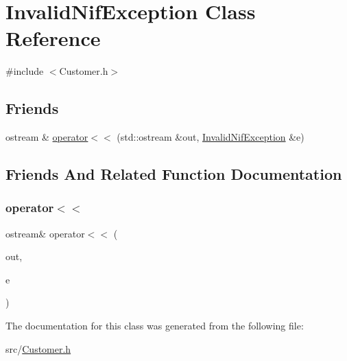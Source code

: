 \hypertarget{classInvalidNifException}{}\section{Invalid\+Nif\+Exception Class Reference}
\label{classInvalidNifException}


{\ttfamily \#include $<$Customer.\+h$>$}

\subsection*{Friends}
\begin{DoxyCompactItemize}
\item 
ostream \& \hyperlink{classInvalidNifException_a0fda405ea9244e1120b812bdd03b7fd8}{operator$<$$<$} (std\+::ostream \&out, \hyperlink{classInvalidNifException}{Invalid\+Nif\+Exception} \&e)
\end{DoxyCompactItemize}


\subsection{Friends And Related Function Documentation}
\hypertarget{classInvalidNifException_a0fda405ea9244e1120b812bdd03b7fd8}{}\label{classInvalidNifException_a0fda405ea9244e1120b812bdd03b7fd8} 
\subsubsection{\texorpdfstring{operator$<$$<$}{operator<<}}
{\footnotesize\ttfamily ostream\& operator$<$$<$ (\begin{DoxyParamCaption}\item[{std\+::ostream \&}]{out,  }\item[{\hyperlink{classInvalidNifException}{Invalid\+Nif\+Exception} \&}]{e }\end{DoxyParamCaption})\hspace{0.3cm}{\ttfamily [friend]}}



The documentation for this class was generated from the following file\+:\begin{DoxyCompactItemize}
\item 
src/\hyperlink{Customer_8h}{Customer.\+h}\end{DoxyCompactItemize}

